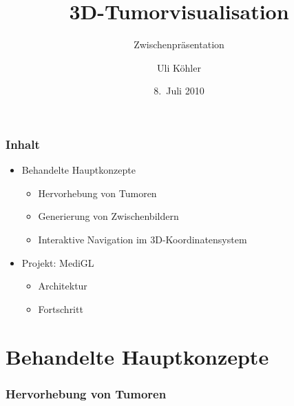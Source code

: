 \documentclass[14pt]{beamer}
\title{3D-Tumorvisualisation}
\subtitle{Zwischenpräsentation}
\author{Uli Köhler}
\institute[EMG]{Ernst-Mach-Gymnasium Haar}
\date{8.~Juli 2010}
\begin{document}
\frame{\titlepage}
\begin{frame}
   \frametitle{Inhalt}
   \begin{itemize}
    \item  Behandelte Hauptkonzepte
    \begin{itemize}
      \item Hervorhebung von Tumoren
      \item Generierung von Zwischenbildern
      \item Interaktive Navigation im 3D-Koordinatensystem
    \end{itemize}
    \pause
    \item Projekt: MediGL
    \begin{itemize}
     \item Architektur
     \item Fortschritt
    \end{itemize}
   \end{itemize}
\end{frame}
  \section{Behandelte Hauptkonzepte}
\begin{frame}
 \frametitle{Hervorhebung von Tumoren}
\end{frame}
\end{document}
